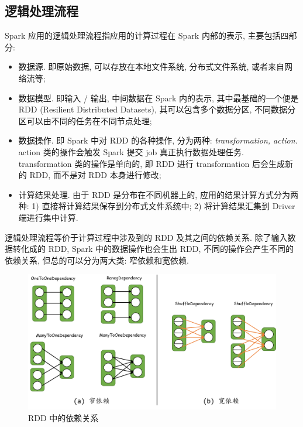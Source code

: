 \subsection{逻辑处理流程}

Spark 应用的逻辑处理流程指应用的计算过程在 Spark 内部的表示, 主要包括四部分:

\begin{itemize}
	\item 数据源. 即原始数据, 可以存放在本地文件系统, 分布式文件系统, 或者来自网络流等;
	
	\item 数据模型. 即输入 / 输出, 中间数据在 Spark 内的表示, 其中最基础的一个便是 RDD (Resilient Distributed Datasets), 其可以包含多个数据分区, 不同数据分区可以由不同的任务在不同节点处理;
	
	\item 数据操作. 即 Spark 中对 RDD 的各种操作, 分为两种: \textit{transformation, action}. action 类的操作会触发 Spark 提交 job 真正执行数据处理任务. transformation 类的操作是单向的, 即 RDD 进行 transformation 后会生成新的 RDD, 而不是对 RDD 本身进行修改;
	
	\item 计算结果处理. 由于 RDD 是分布在不同机器上的, 应用的结果计算方式分为两种: 1) 直接将计算结果保存到分布式文件系统中; 2) 将计算结果汇集到 Driver 端进行集中计算. 
\end{itemize}

逻辑处理流程等价于计算过程中涉及到的 RDD 及其之间的依赖关系. 除了输入数据转化成的 RDD, Spark 中的数据操作也会生出 RDD, 不同的操作会产生不同的依赖关系, 但总的可以分为两大类: 窄依赖和宽依赖. 

\begin{figure}[h]
	\centering
	\includegraphics[width=.95\textwidth]{pics/RDD-Dependency.png}
	\caption{RDD 中的依赖关系}
	\label{fig:rdd_den}
\end{figure}

